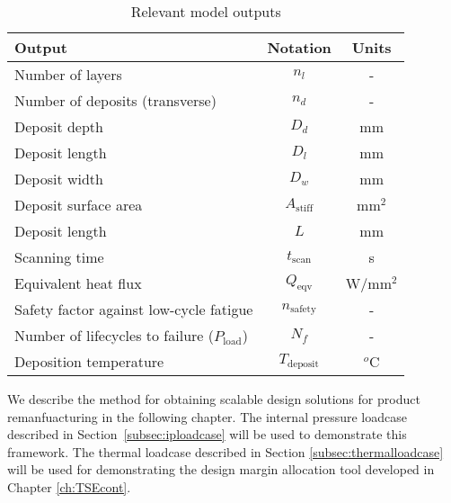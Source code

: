 \begin{table}[h!]
	\centering
	\renewcommand{\arraystretch}{1.0}%
	\normalsize\addtolength{\tabcolsep}{-5pt}
	\caption{Relevant model outputs}
	\label{table:modeloutputs}
	\begin{tabular}{lcc}
	\hline\hline
	\bf Output    & \bf Notation & \bf Units \\ \hline
	Number of layers & $n_l$ & - \\
	Number of deposits (transverse) & $n_d$ & - \\
	Deposit depth  & $D_d$ & mm \\
	Deposit length  & $D_l$ & mm \\
	Deposit width  & $D_w$ & mm \\
	Deposit surface area  & $A_\textrm{stiff}$ & mm$^2$ \\
	Deposit length  & $L$ & mm \\
	Scanning time  & $t_\textrm{scan}$ & s \\
	Equivalent heat flux  & $Q_\textrm{eqv}$ & W/mm$^2$ \\
	Safety factor against low-cycle fatigue & $n_{\textrm{safety}}$ & - \\
	Number of lifecycles to failure (${P}_{\textrm{load}}$)& $N_f$ & - \\
	Deposition temperature & $T_\textrm{deposit}$ & $^o$C \\
	\hline\hline
	\end{tabular}
\end{table}

We describe the method for obtaining scalable design solutions for product remanfuacturing in the following chapter. The internal pressure loadcase described in Section~\ref{subsec:iploadcase} will be used to demonstrate this framework. The thermal loadcase described in Section \ref{subsec:thermalloadcase} will be used for demonstrating the design margin allocation tool developed in Chapter \ref{ch:TSEcont}.